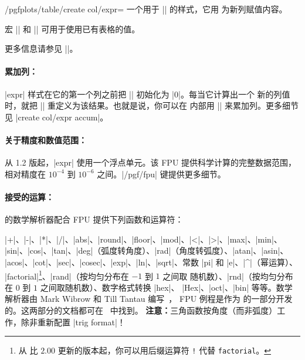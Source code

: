 \documentclass[a4paper,doc2]{ltxdoc}
\begin{document}
\begin{stylekey}{/pgfplots/table/create col/expr=}
    一个用于 |\pgfplotstablecreatecol| 的样式，它用 
    为新列赋值内容。
\begin{codeexample}[]

\end{codeexample}
    宏 |\thisrow| 和 |\nextrow| 可用于使用已有表格的值。

    更多信息请参见 |\pgfplotstablecreatecol|。


    \paragraph{累加列：}

    |expr| 样式在它的第一个列之前把 |\pgfmathaccuma| 初始化为 |0|。每当它计算出一个
    新的列值时，就把 |\pgfmathaccuma| 重定义为该结果。也就是说，你可以在
     内部用 |\pgfmathaccuma| 来累加列。更多细节见
    |create col/expr accum|。


    \paragraph{关于精度和数值范围：}

    从 1.2 版起，|expr| 使用一个浮点单元。该 FPU 提供科学计算的完整数据范围，
    相对精度在 $10^{-4}$ 到 $10^{-6}$ 之间。|/pgf/fpu| 键提供更多细节。


    \paragraph{接受的运算：}

    \PGF 的数学解析器配合 FPU 提供下列函数和运算符：

    |+|、|-|、|*|、|/|、|abs|、|round|、|floor|、|mod|、|<|、|>|、|max|、|min|、
    |sin|、|cos|、|tan|、|deg|（弧度转角度）、|rad|（角度转弧度）、|atan|、|asin|、
    |acos|、|cot|、|sec|、|cosec|、|exp|、|ln|、|sqrt|、常数 |pi| 和 |e|、|^|（幂运算）、
    |factorial|\footnote{从 \PGF{} 比 $2.00$ 更新的版本起，你可以用后缀运算符
    \texttt{!} 代替 \texttt{factorial}。}、|rand|（按均匀分布在 $-1$ 到 $1$ 之间取
    随机数）、|rnd|（按均匀分布在 $0$ 到 $1$ 之间取随机数）、数字格式转换 |hex|、
    |Hex|、|oct|、|bin| 等等。数学解析器由 Mark Wibrow 和 Till Tantau 编写~\cite{tikz}，
    FPU 例程是作为 \PGFPlots{} 的一部分开发的。这两部分的文档都可在~\cite{tikz} 中找到。
    \textbf{注意：}三角函数按角度（而非弧度）工作，除非重新配置 |trig format|！
\end{stylekey}
\end{document}

